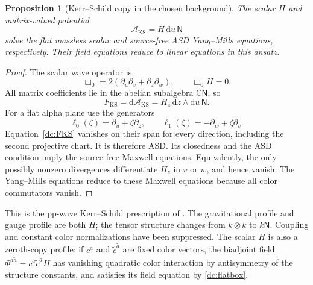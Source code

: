 \documentclass[11pt]{article}
\numberwithin{equation}{section}
\newtheorem{proposition}{Proposition}[section]
\theoremstyle{remark}
\newcommand{\dd}{\mathrm d}
\newcommand{\NN}{\mathsf N}
\begin{document}
\begin{proposition}[Kerr--Schild copy in the chosen background]
The scalar $H$ and matrix-valued potential
\begin{equation}\label{dc:KS}
 \mathcal A_{\mathrm{KS}}=H\,\dd u\,\NN
\end{equation}
solve the flat massless scalar and source-free ASD Yang--Mills equations,
respectively. Their field equations reduce to linear equations in this
ansatz.
\end{proposition}
\begin{proof}
The scalar wave operator is
\begin{equation}\label{dc:flatbox}
 \Box_0=2(\partial_u\partial_v+\partial_z\partial_w),
 \qquad \Box_0 H=0.
\end{equation}
All matrix coefficients lie in the abelian subalgebra $\mathbb C\NN$, so
\begin{equation}\label{dc:FKS}
 F_{\mathrm{KS}}=\dd\mathcal A_{\mathrm{KS}}
 =H_z\,\dd z\wedge\dd u\,\NN.
\end{equation}
For a flat alpha plane use the generators
\begin{equation}\label{dc:flat-alpha}
 \ell_0(\zeta)=\partial_u+\zeta\partial_z,
 \qquad
 \ell_1(\zeta)=-\partial_w+\zeta\partial_v.
\end{equation}
Equation~\eqref{dc:FKS} vanishes on their span for every direction,
including the second projective chart. It is therefore ASD.
Its closedness and the ASD condition imply the source-free Maxwell
equations. Equivalently, the only possibly nonzero divergences differentiate
$H_z$ in $v$ or $w$, and hence vanish. The Yang--Mills equations reduce to
these Maxwell equations because all color commutators vanish.
\end{proof}

This is the pp-wave Kerr--Schild prescription of
\cite[Sec.~5.1, Eqs.~(72)--(74)]{DC-MOW}. The gravitational profile and
gauge profile are both $H$; the tensor structure changes from $k\otimes k$
to $k\NN$. Coupling and constant color normalizations have been suppressed.
The scalar $H$ is also a zeroth-copy profile: if $c^a$ and
$\widetilde c^{\tilde a}$ are fixed color vectors, the biadjoint field
$\Phi^{a\tilde a}=c^a\widetilde c^{\tilde a}H$ has vanishing quadratic
color interaction by antisymmetry of the structure constants, and satisfies
its field equation by \eqref{dc:flatbox}.
\end{document}
